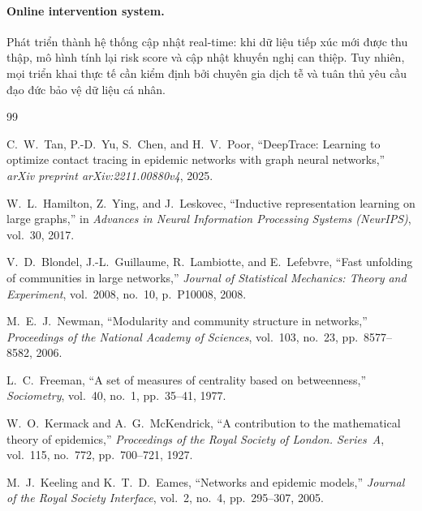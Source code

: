 \documentclass[12pt,a4paper]{report}
\theoremstyle{definition}
\begin{document}
\paragraph{Online intervention system.} Phát triển thành hệ thống cập nhật real-time: khi dữ liệu tiếp xúc mới được thu thập, mô hình tính lại risk score và cập nhật khuyến nghị can thiệp. Tuy nhiên, mọi triển khai thực tế cần kiểm định bởi chuyên gia dịch tễ và tuân thủ yêu cầu đạo đức bảo vệ dữ liệu cá nhân.

\clearpage
{}
{}
\begin{thebibliography}{99}
\setlength{\itemsep}{6pt}

    C.~W.~Tan, P.-D.~Yu, S.~Chen, and H.~V.~Poor,
    ``DeepTrace: Learning to optimize contact tracing in epidemic networks with graph neural networks,''
    \textit{arXiv preprint arXiv:2211.00880v4}, 2025.

    W.~L.~Hamilton, Z.~Ying, and J.~Leskovec,
    ``Inductive representation learning on large graphs,''
    in \textit{Advances in Neural Information Processing Systems (NeurIPS)},
    vol.~30, 2017.

    V.~D.~Blondel, J.-L.~Guillaume, R.~Lambiotte, and E.~Lefebvre,
    ``Fast unfolding of communities in large networks,''
    \textit{Journal of Statistical Mechanics: Theory and Experiment},
    vol.~2008, no.~10, p.~P10008, 2008.

    M.~E.~J.~Newman,
    ``Modularity and community structure in networks,''
    \textit{Proceedings of the National Academy of Sciences},
    vol.~103, no.~23, pp.~8577--8582, 2006.

    L.~C.~Freeman,
    ``A set of measures of centrality based on betweenness,''
    \textit{Sociometry}, vol.~40, no.~1, pp.~35--41, 1977.

    W.~O.~Kermack and A.~G.~McKendrick,
    ``A contribution to the mathematical theory of epidemics,''
    \textit{Proceedings of the Royal Society of London. Series~A},
    vol.~115, no.~772, pp.~700--721, 1927.

    M.~J.~Keeling and K.~T.~D.~Eames,
    ``Networks and epidemic models,''
    \textit{Journal of the Royal Society Interface},
    vol.~2, no.~4, pp.~295--307, 2005.


\end{thebibliography}
\end{document}
